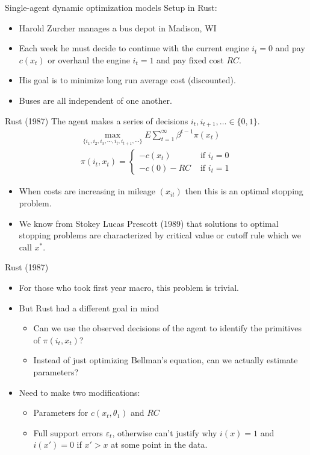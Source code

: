 \documentclass[xcolor=pdftex,dvipsnames,table,mathserif]{beamer}
\begin{document}
\begin{frame}{Single-agent dynamic optimization models}
Setup in Rust:
\begin{itemize}
\item Harold Zurcher manages a bus depot in Madison, WI
\item Each week he must decide to continue with the current engine $i_t=0$ and pay $c(x_{t})$ or overhaul the engine $i_t=1$ and pay fixed cost $RC$.
\item His goal is to minimize \alert{long run average cost} (discounted).
\item Buses are all  \alert{independent} of one another.
\end{itemize}
\end{frame}




\begin{frame}{Rust (1987)}
The agent makes a series of decisions $i_t,i_{t+1},\ldots \in \{0,1\}$.
\begin{eqnarray*}
\max_{\{i_1, i_2, i_3, \cdots, i_t, i_{t+1}, \cdots \}} E \sum^{\infty}_{t=1} \beta^{t-1} \pi (x_t)\\
\pi \left(i_{t},x_{t} \right)=
		\begin{cases}
		-c\left(x_{t} \right)  & \mbox{ if }i_{t}=0\\		
		 -c\left(0\right) -RC& \mbox{ if }i_{t}=1
		\end{cases}
\end{eqnarray*}
\begin{itemize}
\item When costs are increasing in mileage $(x_{it})$ then this is an \alert{optimal stopping problem}.
\item We know from Stokey Lucas Prescott (1989) that solutions to optimal stopping problems are characterized by \alert{critical value} or \alert{cutoff rule} which we call $x^*$.
\end{itemize}
\end{frame}

\begin{frame}{Rust (1987)}
\begin{itemize}
\item For those who took first year macro, this problem is trivial. 
\item But Rust had a different goal in mind
\begin{itemize}
\item Can we use the observed decisions of the agent to identify the primitives of $\pi(i_t,x_t)$?
\item Instead of just optimizing Bellman's equation, can we actually \alert{estimate parameters}?
\end{itemize}
\item Need to make two modifications: 
\begin{itemize}
\item Parameters for $c(x_t,\theta_1)$ and $RC$
\item Full support errors $\varepsilon_{t}$, otherwise can't justify why $i(x)=1$ and $i(x')=0$ if $x'>x$ at some point in the data.
\end{itemize}
\end{itemize}
\end{frame}
\end{document}
